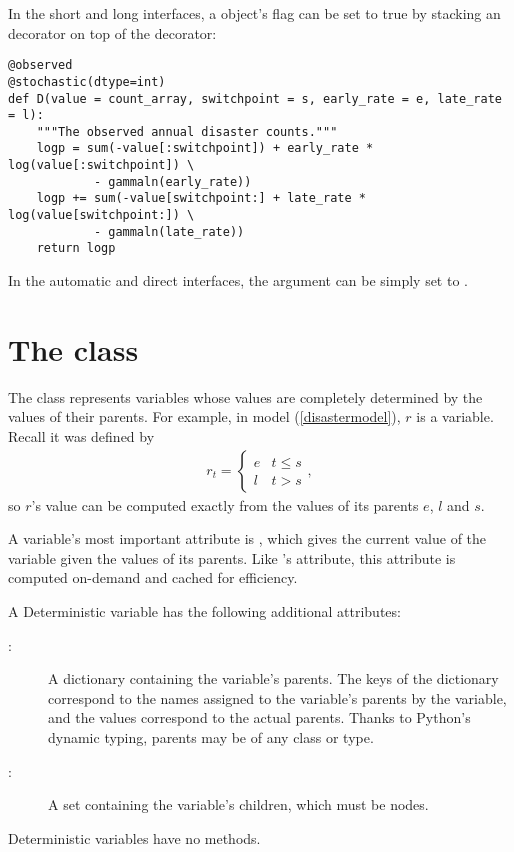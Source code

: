 In the short and long interfaces, a  object's  flag can be set to true by stacking an  decorator on top of the  decorator:
\begin{verbatim}
@observed
@stochastic(dtype=int)
def D(value = count_array, switchpoint = s, early_rate = e, late_rate = l):
    """The observed annual disaster counts."""
    logp = sum(-value[:switchpoint]) + early_rate * log(value[:switchpoint]) \
            - gammaln(early_rate))
    logp += sum(-value[switchpoint:] + late_rate * log(value[switchpoint:]) \
            - gammaln(late_rate))
    return logp
\end{verbatim}
In the automatic and direct interfaces, the  argument can be simply set to .


\hypertarget{deterministic}{}
\section*{The  class} \label{deterministic}

The \code{Deterministic} class represents variables whose values are completely determined by the values of their parents. For example, in model (\ref{disastermodel}), $r$ is a  variable. Recall it was defined by
\begin{eqnarray*}
    r_t=\left\{\begin{array}{ll}
        e & t\le s\\ l & t>s
        \end{array}\right.,
\end{eqnarray*}
so $r$'s value can be computed exactly from the values of its parents $e$, $l$ and $s$.

A \code{deterministic} variable's most important attribute is \code{\bfseries value}, which gives the current value of the variable given the values of its parents. Like 's  attribute, this attribute is computed on-demand and cached for efficiency.

A Deterministic variable has the following additional attributes:
\begin{description}
    \item[\code{parents}:] A dictionary containing the variable's parents. The keys of the dictionary correspond to the names assigned to the variable's parents by the variable, and the values correspond to the actual parents. Thanks to Python's dynamic typing, parents may be of any class or type.
    \item[:] A set containing the variable's children, which must be nodes.
\end{description}
Deterministic variables have no methods.


